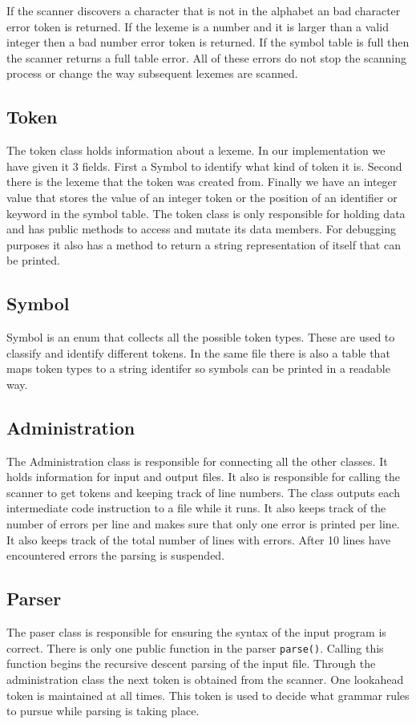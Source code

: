 \documentclass{article}
\begin{document}
If the scanner discovers a character that is not in the alphabet an bad character
error token is returned. If the lexeme is a number and it is larger than a
valid integer then a bad number error token is returned. If the symbol table
is full then the scanner returns a full table error. All of these errors do not
stop the scanning process or change the way subsequent lexemes are scanned.

\subsection{Token}
The token class holds information about a lexeme. In our implementation we have
given it 3 fields. First a Symbol to identify what kind of token it is. Second
there is the lexeme that the token was created from. Finally we have an integer
value that stores the value of an integer token or the position of an identifier
or keyword in the symbol table. The token class is only responsible for holding
data and has public methods to access and mutate its data members. For debugging
purposes it also has a method to return a string representation of itself that
can be printed.

\subsection{Symbol}
Symbol is an enum that collects all the possible token types. These are used to
classify and identify different tokens. In the same file there is also a table
that maps token types to a string identifer so symbols can be printed in a
readable way.

\subsection{Administration}
The Administration class is responsible for connecting all the other classes. It
holds information for input and output files. It also is responsible for calling
the scanner to get tokens and keeping track of line numbers. The class
outputs each intermediate code instruction to a file while it runs. It also keeps track
of the number of errors per line and makes sure that only one error is printed
per line. It also keeps track of the total number of lines with errors. After 10
lines have encountered errors the parsing is suspended.

\subsection{Parser}
The paser class is responsible for ensuring the syntax of the input program is correct.
There is only one public function in the parser \verb|parse()|. Calling this function begins
the recursive descent parsing of the input file. Through the administration class the next
token is obtained from the scanner. One lookahead token is maintained at all times. This token
is used to decide what grammar rules to pursue while parsing is taking place.
\end{document}
